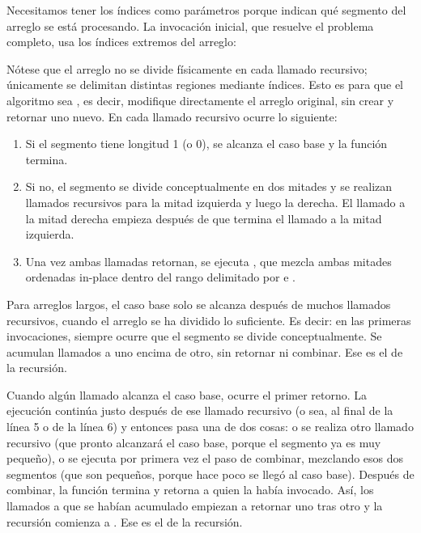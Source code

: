 Necesitamos tener los índices como parámetros porque indican qué segmento del arreglo se está procesando. La invocación inicial, que resuelve el problema completo, usa los índices extremos del arreglo:


Nótese que el arreglo no se divide físicamente en cada llamado recursivo; únicamente se delimitan distintas regiones mediante índices. Esto es para que el algoritmo sea , es decir, modifique directamente el arreglo original, sin crear y retornar uno nuevo. En cada llamado recursivo ocurre lo siguiente:
\begin{enumerate}
    \item Si el segmento tiene longitud 1 (o 0), se alcanza el caso base y la función termina.
    
    \item Si no, el segmento se divide conceptualmente en dos mitades y se realizan llamados recursivos para la mitad izquierda y luego la derecha. El llamado a la mitad derecha empieza después de que termina el llamado a la mitad izquierda.
    
    \item Una vez ambas llamadas retornan, se ejecuta , que mezcla ambas mitades ordenadas in-place dentro del rango delimitado por  e .
\end{enumerate}

Para arreglos largos, el caso base solo se alcanza después de muchos llamados recursivos, cuando el arreglo se ha dividido lo suficiente. Es decir: en las primeras invocaciones, siempre ocurre que el segmento se divide conceptualmente. Se acumulan llamados a  uno encima de otro, sin retornar ni combinar. Ese es el  de la recursión.

Cuando algún llamado alcanza el caso base, ocurre el primer retorno. La ejecución continúa justo después de ese llamado recursivo (o sea, al final de la línea 5 o de la línea 6) y entonces pasa una de dos cosas: o se realiza otro llamado recursivo (que pronto alcanzará el caso base, porque el segmento ya es muy pequeño), o se ejecuta por primera vez el paso de combinar, mezclando esos dos segmentos (que son pequeños, porque hace poco se llegó al caso base). Después de combinar, la función termina y retorna a quien la había invocado. Así, los llamados a  que se habían acumulado empiezan a retornar uno tras otro y la recursión comienza a . Ese es el  de la recursión.

